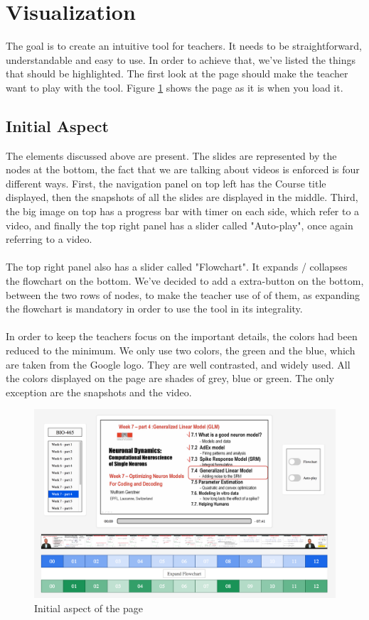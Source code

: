 \documentclass[11pt,a4paper]{article}
\begin{document}
\section{Visualization}

The goal is to create an intuitive tool for teachers. It needs to be straightforward, understandable and easy to use. In order to achieve that, we've listed the things that should be highlighted. The first look at the page should make the teacher want to play with the tool. Figure \ref{initial} shows the page as it is when you load it.

\subsection{Initial Aspect}
The elements discussed above are present. The slides are represented by the nodes at the bottom, the fact that we are talking about videos is enforced is four different ways. First, the navigation panel on top left has the Course title displayed, then the snapshots of all the slides are displayed in the middle. Third, the big image on top has a progress bar with timer on each side, which refer to a video, and finally the top right panel has a slider called "Auto-play", once again referring to a video.\\
\\
The top right panel also has a slider called "Flowchart". It expands / collapses the flowchart on the bottom. We've decided to add a extra-button on the bottom, between the two rows of nodes, to make the teacher use of of them, as expanding the flowchart is mandatory in order to use the tool in its integrality. \\
\\
In order to keep the teachers focus on the important details, the colors had been reduced to the minimum. We only use two colors, the green and the blue, which are taken from the Google \cite{google} logo. They are well contrasted, and widely used. All the colors displayed on the page are shades of grey, blue or green. The only exception are the snapshots and the video.

\begin{figure}[t]
\captionsetup{justification=centering}
\includegraphics[width=\textwidth]{pictures/initial.png}
\caption{Initial aspect of the page}
\label{initial}
\end{figure} 
\end{document}
